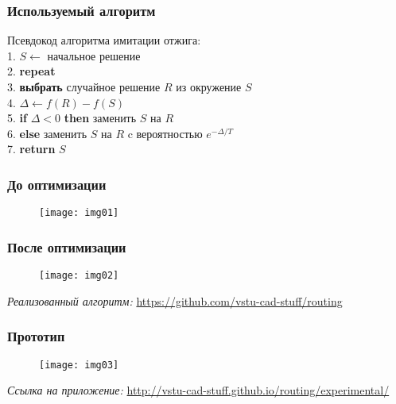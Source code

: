 \begin{frame}
    \frametitle{Используемый алгоритм}
    Псевдокод алгоритма имитации отжига:\\
    1. \( S \leftarrow \) начальное решение\\
    2. \textbf{repeat}\\
    3. \hspace*{2em} \textbf{выбрать} случайное решение \( R \) из окружение \( S \)\\
    4. \hspace*{2em} \( \Delta \leftarrow f(R) - f(S) \)\\
    5. \hspace*{2em} \textbf{if} \( \Delta < 0 \) \textbf{then} заменить \( S \) на \( R \)\\
    6. \hspace*{2em} \textbf{else} заменить \( S \) на \( R \) c вероятностью \( e^{-\Delta/T} \)\\
    7. \textbf{return} \( S \)
\end{frame}

\begin{frame}
    \frametitle{До оптимизации}
    \begin{figure}
        \center
        \texttt{[image: img01]}
    \end{figure}
\end{frame}

\begin{frame}
    \frametitle{После оптимизации}
    \begin{figure}
        \center
        \texttt{[image: img02]}
    \end{figure}
    \small\emph{Реализованный алгоритм:} \url{https://github.com/vstu-cad-stuff/routing}
\end{frame}

\begin{frame}
    \frametitle{Прототип}
    \begin{figure}
        \center
        \texttt{[image: img03]}
    \end{figure}
    \small\emph{Ссылка на приложение:} \url{http://vstu-cad-stuff.github.io/routing/experimental/}
\end{frame}